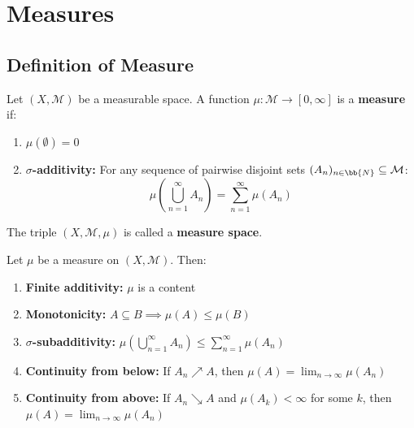 \chapter{Measures}

\section{Definition of Measure}

\begin{definition}[Measure]
Let $(X, \mathcal{M})$ be a measurable space. A function $\mu: \mathcal{M} \to [0, \infty]$ is a \textbf{measure} if:
\begin{enumerate}
    \item $\mu(\emptyset) = 0$
    \item \textbf{$\sigma$-additivity:} For any sequence of pairwise disjoint sets $(A_n)_{n \in \bb{N}} \subseteq \mathcal{M}$:
    \[ \mu\left(\bigcup_{n=1}^{\infty} A_n\right) = \sum_{n=1}^{\infty} \mu(A_n) \]
\end{enumerate}
The triple $(X, \mathcal{M}, \mu)$ is called a \textbf{measure space}.
\end{definition}

\begin{proposition}
Let $\mu$ be a measure on $(X, \mathcal{M})$. Then:
\begin{enumerate}
    \item \textbf{Finite additivity:} $\mu$ is a content
    \item \textbf{Monotonicity:} $A \subseteq B \implies \mu(A) \leq \mu(B)$
    \item \textbf{$\sigma$-subadditivity:} $\mu(\bigcup_{n=1}^\infty A_n) \leq \sum_{n=1}^\infty \mu(A_n)$
    \item \textbf{Continuity from below:} If $A_n \nearrow A$, then $\mu(A) = \lim_{n \to \infty} \mu(A_n)$
    \item \textbf{Continuity from above:} If $A_n \searrow A$ and $\mu(A_k) < \infty$ for some $k$, then $\mu(A) = \lim_{n \to \infty} \mu(A_n)$
\end{enumerate}
\end{proposition}

